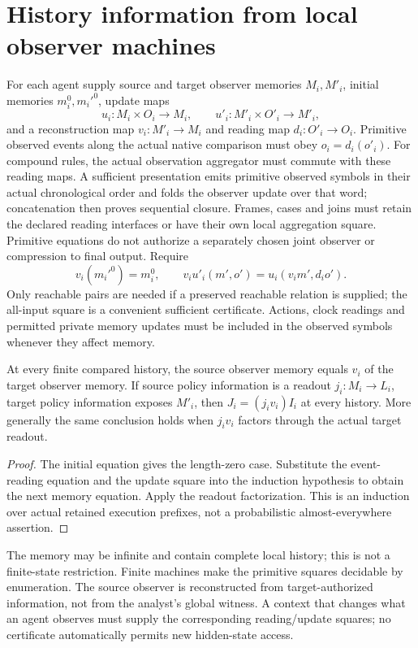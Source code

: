 \documentclass[11pt]{article}
\begin{document}
\section{History information from local observer machines}
For each agent supply source and target observer memories $M_i,M'_i$, initial memories $m_i^0,m_i'^0$, update maps
\[
 u_i:M_i\times O_i\to M_i,\qquad u'_i:M'_i\times O'_i\to M'_i,
\]
and a reconstruction map $v_i:M'_i\to M_i$ and reading map $d_i:O'_i\to O_i$. Primitive observed events along the actual native comparison must obey $o_i=d_i(o'_i)$. For compound rules, the actual observation aggregator must commute with these reading maps. A sufficient presentation emits primitive observed symbols in their actual chronological order and folds the observer update over that word; concatenation then proves sequential closure. Frames, cases and joins must retain the declared reading interfaces or have their own local aggregation square. Primitive equations do not authorize a separately chosen joint observer or compression to final output. Require
\[
 v_i(m_i'^0)=m_i^0,\qquad
 v_i u'_i(m',o')=u_i(v_i m',d_i o'). \tag{O}
\]
Only reachable pairs are needed if a preserved reachable relation is supplied; the all-input square is a convenient sufficient certificate. Actions, clock readings and permitted private memory updates must be included in the observed symbols whenever they affect memory.

\begin{proposition}
At every finite compared history, the source observer memory equals $v_i$ of the target observer memory. If source policy information is a readout $j_i:M_i\to L_i$, target policy information exposes $M'_i$, then $J_i=(j_i v_i)I_i$ at every history. More generally the same conclusion holds when $j_i v_i$ factors through the actual target readout.
\end{proposition}
\begin{proof}
The initial equation gives the length-zero case. Substitute the event-reading equation and the update square into the induction hypothesis to obtain the next memory equation. Apply the readout factorization. This is an induction over actual retained execution prefixes, not a probabilistic almost-everywhere assertion.
\end{proof}

The memory may be infinite and contain complete local history; this is not a finite-state restriction. Finite machines make the primitive squares decidable by enumeration. The source observer is reconstructed from target-authorized information, not from the analyst's global witness. A context that changes what an agent observes must supply the corresponding reading/update squares; no certificate automatically permits new hidden-state access.
\end{document}
